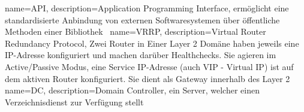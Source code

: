 {
  name=API,
  description={Application Programming Interface, ermöglicht eine
               standardisierte Anbindung von externen Softwaresystemen über
               öffentliche Methoden einer Bibliothek~\cite{HowDoAPIsEvolve}}
}
{
  name=VRRP,
  description={Virtual Router Redundancy Protocol, Zwei Router in Einer Layer 2 Domäne haben jeweils eine IP-Adresse konfiguriert und machen darüber Healthchecks. Sie agieren im Active/Passive Modus, eine Service IP-Adresse (auch VIP - Virtual IP) ist auf dem aktiven Router konfiguriert. Sie dient als Gateway innerhalb des Layer 2}
}
{
  name=DC,
  description={Domain Controller, ein Server, welcher einen Verzeichnisdienst zur Verfügung stellt}
}
